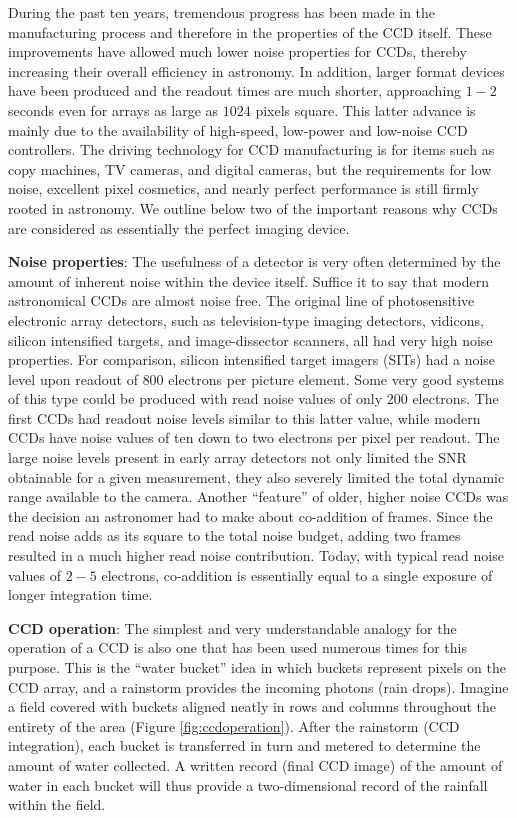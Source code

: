 \documentclass[a4paper,10pt]{article}
\begin{document}
{\noindent}During the past ten years, tremendous progress has been made in the manufacturing process and therefore in the properties of the CCD itself. These improvements have allowed much lower noise properties for CCDs, thereby increasing their overall efficiency in astronomy. In addition, larger format devices have been produced and the readout times are much shorter, approaching $1-2$ seconds even for arrays as large as $1024$ pixels square. This latter advance is mainly due to the availability of high-speed, low-power and low-noise CCD controllers. The driving technology for CCD manufacturing is for items such as copy machines, TV cameras, and digital cameras, but the requirements for low noise, excellent pixel cosmetics, and nearly perfect performance is still firmly rooted in astronomy. We outline below two of the important reasons why CCDs are considered as essentially the perfect imaging device.

{\noindent}\textbf{Noise properties}: The usefulness of a detector is very often determined by the amount of inherent noise within the device itself. Suffice it to say that modern astronomical CCDs are almost noise free. The original line of photosensitive electronic array detectors, such as television-type imaging detectors, vidicons, silicon intensified targets, and image-dissector scanners, all had very high noise properties. For comparison, silicon intensified target imagers (SITs) had a noise level upon readout of $800$ electrons per picture element. Some very good systems of this type could be produced with read noise values of only $200$ electrons. The first CCDs had readout noise levels similar to this latter value, while modern CCDs have noise values of ten down to two electrons per pixel per readout. The large noise levels present in early array detectors not only limited the SNR obtainable for a given measurement, they also severely limited the total dynamic range available to the camera. Another ``feature'' of older, higher noise CCDs was the decision an astronomer had to make about co-addition of frames. Since the read noise adds as its square to the total noise budget, adding two frames resulted in a much higher read noise contribution. Today, with typical read noise values of $2-5$ electrons, co-addition is essentially equal to a single exposure of longer integration time.

{\noindent}\textbf{CCD operation}: The simplest and very understandable analogy for the operation of a CCD is also one that has been used numerous times for this purpose. This is the ``water bucket'' idea in which buckets represent pixels on the CCD array, and a rainstorm provides the incoming photons (rain drops). Imagine a field covered with buckets aligned neatly in rows and columns throughout the entirety of the area (Figure \ref{fig:ccdoperation}). After the rainstorm (CCD integration), each bucket is transferred in turn and metered to determine the amount of water collected. A written record (final CCD image) of the amount of water in each bucket will thus provide a two-dimensional record of the rainfall within the field.
\end{document}
